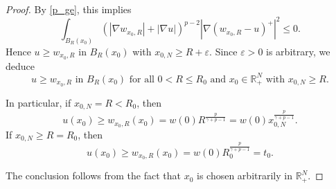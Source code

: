 \documentclass[10pt,a4paper]{amsart}
\begin{document}
\begin{proof}
		By \eqref{p_ge}, this implies
		\[
		\int_{B_R(x_0)} (|\nabla w_{x_0,R}| + |\nabla u|)^{p-2} |\nabla (w_{x_0,R}-u)^+|^2 \le 0.
		\]
		Hence $u \ge w_{x_0,R}$ in $B_R(x_0)$ with $x_{0,N} \ge R + \varepsilon$. Since $\varepsilon>0$ is arbitrary, we deduce
		\[
		u \ge w_{x_0,R} \text{ in } B_R(x_0) \text{ for all } 0<R\le R_0 \text{ and } x_0 \in \mathbb{R}^N_+ \text{ with } x_{0,N} \ge R.
		\]
		
		In particular, if $x_{0,N} = R < R_0$, then
		\[
		u(x_0) \ge w_{x_0,R}(x_0) = w(0)R^\frac{p}{\gamma+p-1} = w(0) x_{0,N}^\frac{p}{\gamma+p-1}.
		\]
		If $x_{0,N} \ge R = R_0$, then
		\[
		u(x_0) \ge w_{x_0,R}(x_0) = w(0)R_0^\frac{p}{\gamma+p-1} = t_0.
		\]
		
		The conclusion follows from the fact that $x_0$ is chosen arbitrarily in $\mathbb{R}^N_+$.
	\end{proof}
\end{document}
